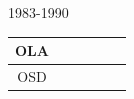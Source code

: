 \documentclass[ xcolor = pdftex, dvipsnames, table ]{beamer}
\begin{document}
\begin{frame}{1983-1990}
\begin{minipage}[c]{0.49\textwidth}
{\begin{tabular}{|c|c|c|c|c|c|}
        OLA&\cellcolor[HTML]{984EA3}&\cellcolor[HTML]{984EA3}&\cellcolor[HTML]{FF7F00}&\cellcolor[HTML]{FF7F00}&\cellcolor[HTML]{984EA3}\\ \hline %
        OSD&\cellcolor[HTML]{984EA3}&\cellcolor[HTML]{984EA3}&\cellcolor[HTML]{FF7F00}&\cellcolor[HTML]{FF7F00}&\cellcolor[HTML]{984EA3}\\ \hline %
\end{tabular}}
\end{minipage}
\end{frame}
\end{document}
